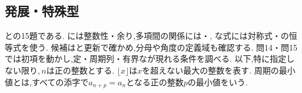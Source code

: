     \subsection{発展・特殊型}\label{節：発展パターン・特殊性質型の演習}
      との15題である.
                には整数性・余り,多項間の関係には・,
                な式には対称式・の恒等式を使う.
                候補はと更新で確かめ,分母や角度の定義域も確認する.
      問14・問15では初項を動かし,定・周期列・有界なが現れる条件を調べる.
      以下,特に指定しない限り,\,$\displaystyle n$は正の整数とする.
      $\displaystyle \lfloor x\rfloor$は$\displaystyle x$を超えない最大の整数を表す.
      周期の最小値とは,すべての添字で$\displaystyle a_{n+p}=a_n$となる正の整数$\displaystyle p$の最小値をいう.

